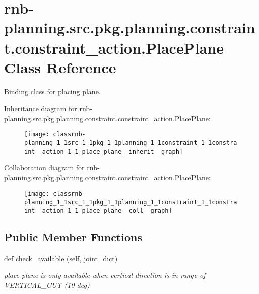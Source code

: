 \hypertarget{classrnb-planning_1_1src_1_1pkg_1_1planning_1_1constraint_1_1constraint__action_1_1_place_plane}{}\section{rnb-\/planning.src.\+pkg.\+planning.\+constraint.\+constraint\+\_\+action.\+Place\+Plane Class Reference}
\label{classrnb-planning_1_1src_1_1pkg_1_1planning_1_1constraint_1_1constraint__action_1_1_place_plane}


\hyperlink{classrnb-planning_1_1src_1_1pkg_1_1planning_1_1constraint_1_1constraint__action_1_1_binding}{Binding} class for placing plane.  




Inheritance diagram for rnb-\/planning.src.\+pkg.\+planning.\+constraint.\+constraint\+\_\+action.\+Place\+Plane\+:\nopagebreak
\begin{figure}[H]
\begin{center}
\leavevmode
\texttt{[image: classrnb-planning\_1\_1src\_1\_1pkg\_1\_1planning\_1\_1constraint\_1\_1constraint\_\_action\_1\_1\_place\_plane\_\_inherit\_\_graph]}
\end{center}
\end{figure}


Collaboration diagram for rnb-\/planning.src.\+pkg.\+planning.\+constraint.\+constraint\+\_\+action.\+Place\+Plane\+:\nopagebreak
\begin{figure}[H]
\begin{center}
\leavevmode
\texttt{[image: classrnb-planning\_1\_1src\_1\_1pkg\_1\_1planning\_1\_1constraint\_1\_1constraint\_\_action\_1\_1\_place\_plane\_\_coll\_\_graph]}
\end{center}
\end{figure}
\subsection*{Public Member Functions}
\begin{DoxyCompactItemize}
\item 
\mbox{\label{classrnb-planning_1_1src_1_1pkg_1_1planning_1_1constraint_1_1constraint__action_1_1_place_plane_a3a0d9a5e913caee69fd74db1d113a3e9}} 
def \hyperlink{classrnb-planning_1_1src_1_1pkg_1_1planning_1_1constraint_1_1constraint__action_1_1_place_plane_a3a0d9a5e913caee69fd74db1d113a3e9}{check\+\_\+available} (self, joint\+\_\+dict)
\begin{DoxyCompactList}\small\item\em place plane is only available when vertical direction is in range of V\+E\+R\+T\+I\+C\+A\+L\+\_\+\+C\+UT (10 deg) \end{DoxyCompactList}\end{DoxyCompactItemize}
